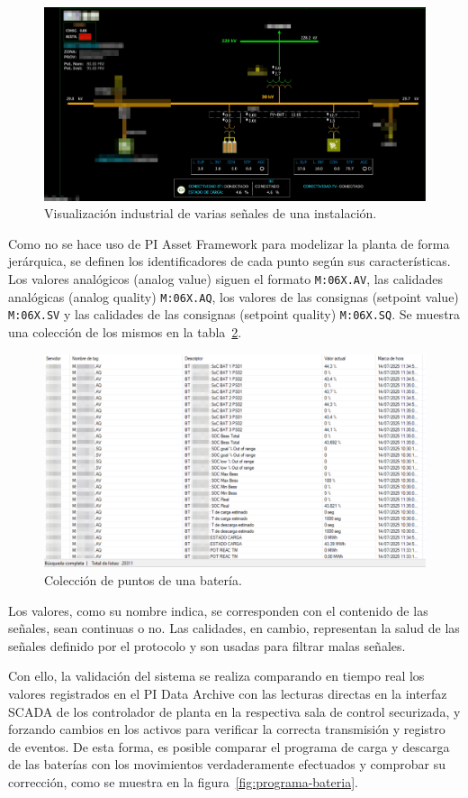 \begin{figure}
  \centering
  \includegraphics[width=0.75\linewidth]{figures/visualizacion-industrial-de-bateria.png}
  \caption{Visualización industrial de varias señales de una instalación.}
  \label{fig:visualizacion-industrial-de-bateria}
\end{figure}

Como no se hace uso de PI Asset Framework para modelizar la planta de forma jerárquica, se definen los identificadores de cada punto según sus características. Los valores analógicos (analog value) siguen el formato \texttt{M:06X.AV}, las calidades analógicas (analog quality) \texttt{M:06X.AQ}, los valores de las consignas (setpoint value) \texttt{M:06X.SV} y las calidades de las consignas (setpoint quality) \texttt{M:06X.SQ}. Se muestra una colección de los mismos en la tabla~\ref{fig:puntos-bateria}.

\begin{figure}
  \centering
  \includegraphics[width=0.75\linewidth]{figures/puntos-bateria.png}
  \caption{Colección de puntos de una batería.}
  \label{fig:puntos-bateria}
\end{figure}

Los valores, como su nombre indica, se corresponden con el contenido de las señales, sean continuas o no. Las calidades, en cambio, representan la salud de las señales definido por el protocolo y son usadas para filtrar malas señales.

Con ello, la validación del sistema se realiza comparando en tiempo real los valores registrados en el PI Data Archive con las lecturas directas en la interfaz SCADA de los controlador de planta en la respectiva sala de control securizada, y forzando cambios en los activos para verificar la correcta transmisión y registro de eventos. De esta forma, es posible comparar el programa de carga y descarga de las baterías con los movimientos verdaderamente efectuados y comprobar su corrección, como se muestra en la figura~\ref{fig:programa-bateria}.

